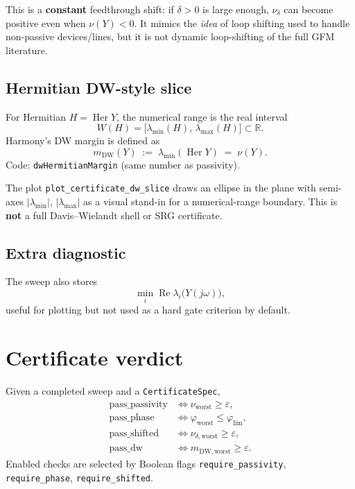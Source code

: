 \documentclass[11pt,a4paper]{article}
\theoremstyle{definition}
\begin{document}
This is a \textbf{constant} feedthrough shift: if $\delta>0$ is large enough,
$\nu_\delta$ can become positive even when $\nu(Y)<0$. It mimics the
\emph{idea} of loop shifting used to handle non-passive devices/lines, but
it is not dynamic loop-shifting of the full GFM literature.

\subsection{Hermitian DW-style slice}

For Hermitian $H=\operatorname{Her} Y$, the numerical range is the real
interval
\begin{equation}
  W(H)=\bigl[\lambda_{\min}(H),\,\lambda_{\max}(H)\bigr]\subset\mathbb{R}.
\end{equation}
Harmony's DW margin is defined as
\begin{equation}
  m_{\mathrm{DW}}(Y)
  \;:=\;
  \lambda_{\min}(\operatorname{Her} Y)
  \;=\;
  \nu(Y).
\end{equation}
Code: \texttt{dwHermitianMargin} (same number as passivity).

The plot \texttt{plot\_certificate\_dw\_slice} draws an ellipse in the plane
with semi-axes $|\lambda_{\min}|$, $|\lambda_{\max}|$ as a visual stand-in for
a numerical-range boundary. This is \textbf{not} a full Davis--Wielandt shell
or SRG certificate.

\subsection{Extra diagnostic}

The sweep also stores
\begin{equation}
  \min_i \operatorname{Re}\lambda_i\bigl(Y(j\omega)\bigr),
\end{equation}
useful for plotting but not used as a hard gate criterion by default.

\section{Certificate verdict}

Given a completed sweep and a \texttt{CertificateSpec},
\begin{align}
  \mathrm{pass\_passivity}
  &\iff \nu_{\mathrm{worst}}\ge\varepsilon,\\
  \mathrm{pass\_phase}
  &\iff \varphi_{\mathrm{worst}}\le\varphi_{\mathrm{lim}},\\
  \mathrm{pass\_shifted}
  &\iff \nu_{\delta,\mathrm{worst}}\ge\varepsilon,\\
  \mathrm{pass\_dw}
  &\iff m_{\mathrm{DW,worst}}\ge\varepsilon.
\end{align}
Enabled checks are selected by Boolean flags
\texttt{require\_passivity}, \texttt{require\_phase}, \texttt{require\_shifted}.
\end{document}
